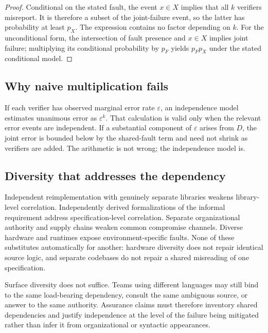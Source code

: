 \documentclass[11pt,openany]{book}
\begin{document}
\begin{proof}
Conditional on the stated fault, the event \(x\in X\) implies that all
\(k\) verifiers misreport. It is therefore a subset of the joint-failure event,
so the latter has probability at least \(p_X\). The expression contains no
factor depending on \(k\). For the unconditional form, the intersection of
fault presence and \(x\in X\) implies joint failure; multiplying its conditional
probability by \(p_F\) yields \(p_Fp_X\) under the stated conditional model.
\end{proof}

\subsection{Why naive multiplication fails}

If each verifier has observed marginal error rate \(\varepsilon\), an
independence model estimates unanimous error as \(\varepsilon^k\). That
calculation is valid only when the relevant error events are independent. If a
substantial component of \(\varepsilon\) arises from \(D\), the joint error is
bounded below by the shared-fault term and need not shrink as verifiers are
added. The arithmetic is not wrong; the independence model is.

\subsection{Diversity that addresses the dependency}

Independent reimplementation with genuinely separate libraries weakens
library-level correlation. Independently derived formalizations of the
informal requirement address specification-level correlation. Separate
organizational authority and supply chains weaken common compromise channels.
Diverse hardware and runtimes expose environment-specific faults. None of
these substitutes automatically for another: hardware diversity does not
repair identical source logic, and separate codebases do not repair a shared
misreading of one specification.

Surface diversity does not suffice. Teams using different languages may still
bind to the same load-bearing dependency, consult the same ambiguous source,
or answer to the same authority. Assurance claims must therefore inventory
shared dependencies and justify independence at the level of the failure being
mitigated rather than infer it from organizational or syntactic appearances.
\end{document}
